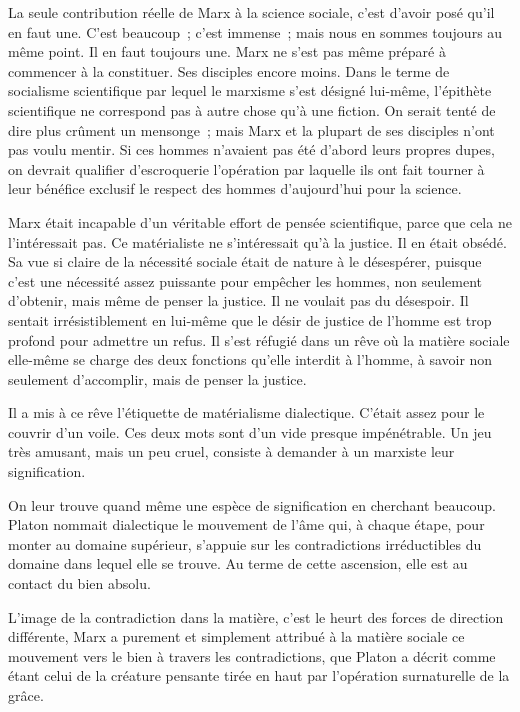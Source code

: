 \documentclass[french,twoside]{book} %
\begin{document}
La seule contribution réelle de Marx à la science sociale, c'est d'avoir posé qu'il en faut une. C'est beaucoup ; c'est immense ; mais nous en sommes toujours au même point. Il en faut toujours une. Marx ne s'est pas même préparé à commencer à la constituer. Ses disciples encore moins. Dans le terme de socialisme scientifique par lequel le marxisme s'est désigné lui-même, l'épithète scientifique ne correspond pas à autre chose qu'à une fiction. On serait tenté de dire plus crûment un mensonge ; mais Marx et la plupart de ses disciples n'ont pas voulu mentir. Si ces hommes n'avaient pas été d'abord leurs propres dupes, on devrait qualifier d'escroquerie l'opération par laquelle ils ont fait tourner à leur bénéfice exclusif le respect des hommes d'aujourd'hui pour la science.\par
Marx était incapable d'un véritable effort de pensée scientifique, parce que cela ne l'intéressait pas. Ce matérialiste ne s'intéressait qu'à la justice. Il en était obsédé. Sa vue si claire de la nécessité sociale était de nature à le désespérer, puisque c'est une nécessité assez puissante pour empêcher les hommes, non seulement d'obtenir, mais même de penser la justice. Il ne voulait pas du désespoir. Il sentait irrésistiblement en lui-même que le désir de justice de l'homme est trop profond pour admettre un refus. Il s'est réfugié dans un rêve où la matière sociale elle-même se charge des deux fonctions qu'elle interdit à l'homme, à savoir non seulement d'accomplir, mais de penser la justice.\par
Il a mis à ce rêve l'étiquette de matérialisme dialectique. C'était assez pour le couvrir d'un voile. Ces deux mots sont d'un vide presque impénétrable. Un jeu très amusant, mais un peu cruel, consiste à demander à un marxiste leur signification.\par
On leur trouve quand même une espèce de signification en cherchant beaucoup. Platon nommait dialectique le mouvement de l'âme qui, à chaque étape, pour monter au domaine supérieur, s'appuie sur les contradictions irréductibles du domaine dans lequel elle se trouve. Au terme de cette ascension, elle est au contact du bien absolu.\par
L'image de la contradiction dans la matière, c'est le heurt des forces de direction différente, Marx a purement et simplement attribué à la matière sociale ce mouvement vers le bien à travers les contradictions, que Platon a décrit comme étant celui de la créature pensante tirée en haut par l'opération surnaturelle de la grâce.\par
\end{document}
